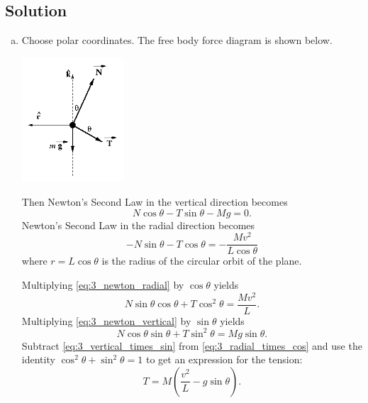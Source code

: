 \documentclass[solutions]{esg8012exam}
\begin{document}
\subsection{Solution}
  \begin{enumerate}[(a)]
    \item Choose polar coordinates. The free body force diagram is shown below.
      \begin{center}\includegraphics[width=0.3\textwidth]{exam1_s3_1}\end{center}
      Then Newton's Second Law in the vertical direction becomes
      \begin{equation}
        N\cos\theta - T\sin\theta - M g = 0. \label{eq:3_newton_vertical}
      \end{equation}
      Newton's Second Law in the radial direction becomes
      \begin{equation}
        - N \sin\theta - T \cos\theta = -\frac{M v^2}{L \cos\theta} \label{eq:3_newton_radial}
      \end{equation}
      where $r = L\cos\theta$ is the radius of the circular orbit of the plane.
      \par
      Multiplying \autoref{eq:3_newton_radial} by $\cos\theta$ yields
      \begin{equation}
        N\sin\theta\cos\theta + T \cos^2 \theta = \frac{M v^2}{L}. \label{eq:3_radial_times_cos}
      \end{equation}
      Multiplying \autoref{eq:3_newton_vertical} by $\sin\theta$ yields
      \begin{equation}
        N\cos\theta\sin\theta + T \sin^2 \theta = M g\sin\theta. \label{eq:3_vertical_times_sin}
      \end{equation}
      Subtract \autoref{eq:3_vertical_times_sin} from \autoref{eq:3_radial_times_cos} and use the identity $\cos^2\theta + \sin^2\theta = 1$ to get an expression for the tension:
      \begin{equation}
        T = M\left(\frac{v^2}{L} - g \sin\theta\right). \label{eq:3_tension}
      \end{equation}

\end{enumerate}
\end{document}
